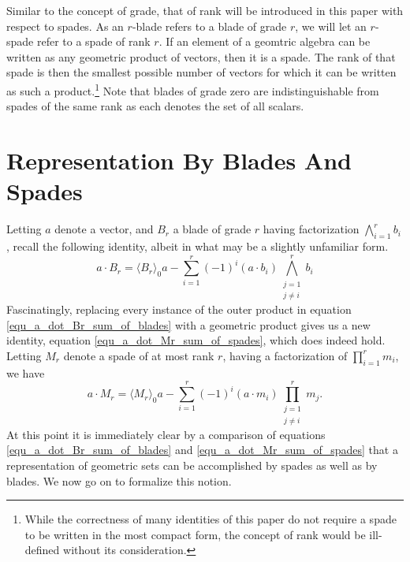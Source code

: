 \documentclass{birkjour}
\theoremstyle{definition}
\theoremstyle{remark}
\numberwithin{equation}{section}
\begin{document}
Similar to the concept of grade, that of rank will be introduced in this paper with respect to spades.  As an $r$-blade
refers to a blade of grade $r$, we will let an $r$-spade refer to a spade of rank $r$.  If an element of a geomtric
algebra can be written as any geometric product of vectors, then it is a spade.  The rank of that spade is then the smallest
possible number of vectors for which it can be written as such a product.\footnote{While the correctness of many identities of this paper
do not require a spade to be written in the most compact form, the concept of rank would be ill-defined without its consideration.}   Note that blades of grade zero
are indistinguishable from spades of the same rank as each denotes the set of all scalars.

\section{Representation By Blades And Spades}

Letting $a$ denote a vector, and $B_r$ a blade of grade $r$ having factorization $\bigwedge_{i=1}^r b_i$, recall
the following identity, albeit in what may be a slightly unfamiliar form.
\begin{equation}\label{equ_a_dot_Br_sum_of_blades}
a\cdot B_r = \langle B_r\rangle_0a - \sum_{i=1}^r(-1)^i(a\cdot b_i)\bigwedge_{\substack{j=1\\j\neq i}}^rb_i
\end{equation}
Fascinatingly, replacing every instance of the outer product in equation \eqref{equ_a_dot_Br_sum_of_blades} with
a geometric product gives us a new identity, equation \eqref{equ_a_dot_Mr_sum_of_spades}, which does indeed hold.  Letting $M_r$ denote
a spade of at most rank $r$, having a factorization of $\prod_{i=1}^r m_i$, we have
\begin{equation}\label{equ_a_dot_Mr_sum_of_spades}
a\cdot M_r = \langle M_r\rangle_0a - \sum_{i=1}^r(-1)^i(a\cdot m_i)\prod_{\substack{j=1\\j\neq i}}^rm_j.
\end{equation}
At this point it is immediately clear by a comparison of equations \eqref{equ_a_dot_Br_sum_of_blades} and \eqref{equ_a_dot_Mr_sum_of_spades}
that a representation of geometric sets can be accomplished by spades as well as by blades.  We now go on to formalize this notion.
\end{document}
